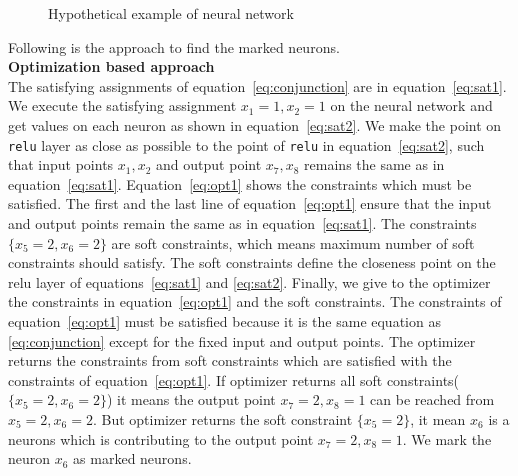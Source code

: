 \begin{figure}[!ht]
	\centering
	\scalebox{0.8}{}
	\caption{Hypothetical example of neural network}
	\label{fig:motivating}
\end{figure}


Following is the approach to find the marked neurons.
\\
\textbf{Optimization based approach}\\
The satisfying assignments of equation~\ref{eq:conjunction} are in equation~\ref{eq:sat1}. 
We execute the satisfying assignment $x_1=1,x_2=1$ on the neural network and get values on each neuron as 
shown in equation~\ref{eq:sat2}. We make the point on \texttt{relu} layer as close as possible 
to the point of \texttt{relu} in equation~\ref{eq:sat2}, such that input points $x_1,x_2$ and 
output point $x_7,x_8$ remains the same as in equation~\ref{eq:sat1}. 
Equation~\ref{eq:opt1} shows the constraints which must be satisfied. The first and the last line of equation~\ref{eq:opt1}
ensure that the input and output points remain the same as in equation~\ref{eq:sat1}. 
The constraints $\{x_5=2, x_6=2\}$ are soft constraints, which means maximum number of soft constraints should satisfy. 
The soft constraints define the closeness point on the relu layer of equations~\ref{eq:sat1} and \ref{eq:sat2}. 
Finally, we give to the optimizer the constraints in equation~\ref{eq:opt1} and the soft constraints. 
The constraints of equation~\ref{eq:opt1} must be satisfied because it is the same equation as \ref{eq:conjunction}
except for the fixed input and output points. 
The optimizer returns the constraints from soft constraints which are satisfied with the constraints 
of equation~\ref{eq:opt1}. If optimizer returns all soft constraints($\{x_5=2,x_6=2\}$) it means the output point
$x_7=2, x_8=1$ can be reached from $x_5=2,x_6=2$. But optimizer returns the soft constraint $\{x_5=2\}$, it mean 
$x_6$ is a neurons which is contributing to the output point $x_7=2, x_8=1$. We mark the neuron $x_6$ as 
marked neurons.  

